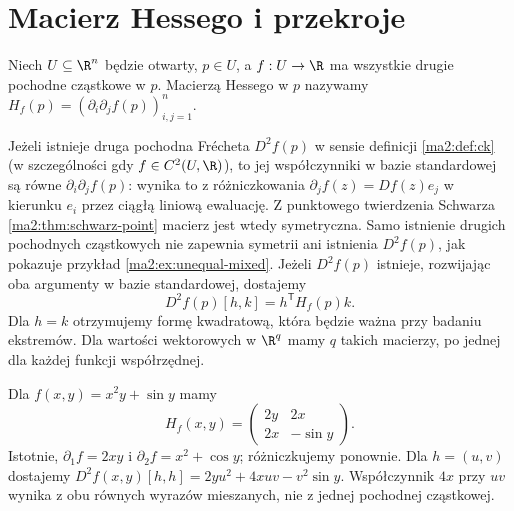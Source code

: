 \section{Macierz Hessego i przekroje}

\begin{definicja}
\label{ma2:def:hessian}
Niech $U\subseteq\R^n$ będzie otwarty, $p\in U$, a $f:U\to\R$
ma wszystkie drugie pochodne cząstkowe w $p$.
Macierzą Hessego w $p$ nazywamy
$H_f(p)=(\partial_i\partial_j f(p))_{i,j=1}^n$.
\end{definicja}

Jeżeli istnieje druga pochodna Frécheta $D^2f(p)$ w sensie
definicji \ref{ma2:def:ck} (w szczególności gdy $f\in C^2(U,\R)$),
to jej współczynniki w bazie standardowej są równe
$\partial_i\partial_j f(p)$: wynika to z różniczkowania
$\partial_j f(z)=Df(z)e_j$ w kierunku $e_i$ przez ciągłą liniową
ewaluację. Z punktowego twierdzenia Schwarza
\ref{ma2:thm:schwarz-point} macierz jest wtedy symetryczna.
Samo istnienie drugich pochodnych cząstkowych nie zapewnia
symetrii ani istnienia $D^2f(p)$, jak pokazuje przykład
\ref{ma2:ex:unequal-mixed}. Jeżeli $D^2f(p)$ istnieje,
rozwijając oba argumenty w bazie standardowej, dostajemy
\[
 D^2f(p)[h,k]=h^{\mathsf T} H_f(p)k.
\]
Dla $h=k$ otrzymujemy formę kwadratową, która będzie
ważna przy badaniu ekstremów. Dla wartości wektorowych
w $\R^q$ mamy $q$ takich macierzy, po jednej dla każdej
funkcji współrzędnej.

\begin{przyklad}
Dla $f(x,y)=x^2y+\sin y$ mamy
\[
 H_f(x,y)=\begin{pmatrix}2y&2x\\2x&-\sin y\end{pmatrix}.
\]
Istotnie, $\partial_1 f=2xy$ i
$\partial_2 f=x^2+\cos y$; różniczkujemy ponownie.
Dla $h=(u,v)$ dostajemy
$D^2f(x,y)[h,h]=2yu^2+4xuv-v^2\sin y$.
Współczynnik $4x$ przy $uv$ wynika z obu równych
wyrazów mieszanych, nie z jednej pochodnej cząstkowej.
\end{przyklad}


